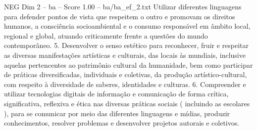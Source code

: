 \begin{textsample}{NEG Dim 2 – ba – Score 1.00 – ba/ba\_ef\_2.txt}
Utilizar diferentes linguagens para defender pontos de vista que respeitem o outro e promovam os direitos humanos, a consciência socioambiental e o consumo responsável em âmbito local, regional e global, atuando criticamente frente a questões do mundo contemporâneo. 5.
Desenvolver o senso estético para reconhecer, fruir e respeitar as diversas manifestações artísticas e culturais, das locais às mundiais, inclusive aquelas pertencentes ao patrimônio cultural da humanidade, bem como participar de práticas diversificadas, individuais e coletivas, da produção artístico-cultural, com respeito à diversidade de saberes, identidades e culturas. 6.
Compreender e utilizar tecnologias digitais de informação e comunicação de forma crítica, significativa, reflexiva e ética nas diversas práticas sociais ( incluindo as escolares ), para se comunicar por meio das diferentes linguagens e mídias, produzir conhecimentos, resolver problemas e desenvolver projetos autorais e coletivos.

\end{textsample}
